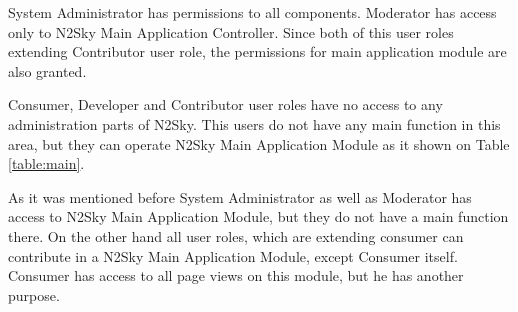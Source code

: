 System Administrator has permissions to all components. Moderator has access only to N2Sky Main Application Controller. Since both of this user roles extending Contributor user role, the permissions for main application module are also granted.

Consumer, Developer and Contributor user roles have no access to any administration parts of N2Sky. This users do not have any main function in this area, but they can operate N2Sky Main Application Module as it shown on Table \ref{table:main}.

\begin{table}[]
\caption{User Roles main functions considering "N2Sky Main Application Module". 
"+" for allowed, "-" for disallowed}
\label{table:main}
\end{table}

As it was mentioned before System Administrator as well as Moderator has access to N2Sky Main Application Module, but they do not have a main function there. On the other hand all user roles, which are extending consumer can contribute in a N2Sky Main Application Module, except Consumer itself. Consumer has access to all page views on this module, but he has another purpose. 

